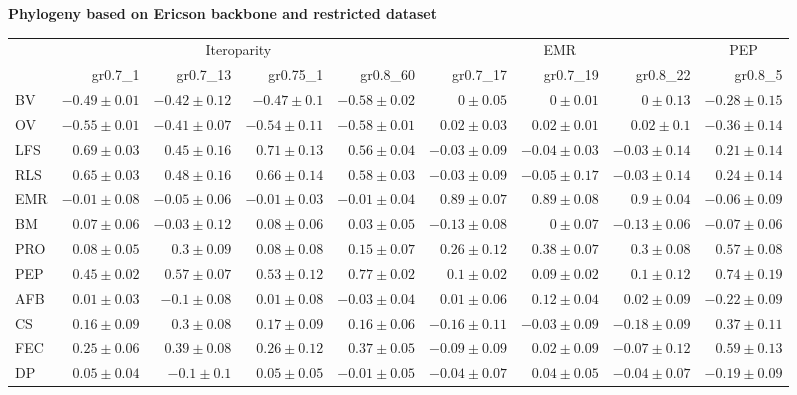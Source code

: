 \begin{landscape}
\begin{table}
\begin{footnotesize}
\textbf{Phylogeny based on Ericson backbone and restricted dataset}

\begin{tabular}{@{}l|rrrr|rrr|r@{}}
\toprule
 & \multicolumn{4}{c|}{Iteroparity} & \multicolumn{3}{c|}{EMR} & \multicolumn{1}{c}{PEP}\\
 & gr0.7\_1 & gr0.7\_13 & gr0.75\_1 & gr0.8\_60 & gr0.7\_17 & gr0.7\_19 & gr0.8\_22 & gr0.8\_5\\
\midrule
BV & $-0.49 \pm 0.01$ & $-0.42 \pm 0.12$ & $-0.47 \pm 0.1$ & $-0.58 \pm 0.02$ & $0 \pm 0.05$ & $0 \pm 0.01$ & $0 \pm 0.13$ & $-0.28 \pm 0.15$\\
OV & $-0.55 \pm 0.01$ & $-0.41 \pm 0.07$ & $-0.54 \pm 0.11$ & $-0.58 \pm 0.01$ & $0.02 \pm 0.03$ & $0.02 \pm 0.01$ & $0.02 \pm 0.1$ & $-0.36 \pm 0.14$\\
LFS & $0.69 \pm 0.03$ & $0.45 \pm 0.16$ & $0.71 \pm 0.13$ & $0.56 \pm 0.04$ & $-0.03 \pm 0.09$ & $-0.04 \pm 0.03$ & $-0.03 \pm 0.14$ & $0.21 \pm 0.14$\\
RLS & $0.65 \pm 0.03$ & $0.48 \pm 0.16$ & $0.66 \pm 0.14$ & $0.58 \pm 0.03$ & $-0.03 \pm 0.09$ & $-0.05 \pm 0.17$ & $-0.03 \pm 0.14$ & $0.24 \pm 0.14$\\
EMR & $-0.01 \pm 0.08$ & $-0.05 \pm 0.06$ & $-0.01 \pm 0.03$ & $-0.01 \pm 0.04$ & $0.89 \pm 0.07$ & $0.89 \pm 0.08$ & $0.9 \pm 0.04$ & $-0.06 \pm 0.09$\\
BM & $0.07 \pm 0.06$ & $-0.03 \pm 0.12$ & $0.08 \pm 0.06$ & $0.03 \pm 0.05$ & $-0.13 \pm 0.08$ & $0 \pm 0.07$ & $-0.13 \pm 0.06$ & $-0.07 \pm 0.06$\\
PRO & $0.08 \pm 0.05$ & $0.3 \pm 0.09$ & $0.08 \pm 0.08$ & $0.15 \pm 0.07$ & $0.26 \pm 0.12$ & $0.38 \pm 0.07$ & $0.3 \pm 0.08$ & $0.57 \pm 0.08$\\
PEP & $0.45 \pm 0.02$ & $0.57 \pm 0.07$ & $0.53 \pm 0.12$ & $0.77 \pm 0.02$ & $0.1 \pm 0.02$ & $0.09 \pm 0.02$ & $0.1 \pm 0.12$ & $0.74 \pm 0.19$\\
AFB & $0.01 \pm 0.03$ & $-0.1 \pm 0.08$ & $0.01 \pm 0.08$ & $-0.03 \pm 0.04$ & $0.01 \pm 0.06$ & $0.12 \pm 0.04$ & $0.02 \pm 0.09$ & $-0.22 \pm 0.09$\\
CS & $0.16 \pm 0.09$ & $0.3 \pm 0.08$ & $0.17 \pm 0.09$ & $0.16 \pm 0.06$ & $-0.16 \pm 0.11$ & $-0.03 \pm 0.09$ & $-0.18 \pm 0.09$ & $0.37 \pm 0.11$\\
FEC & $0.25 \pm 0.06$ & $0.39 \pm 0.08$ & $0.26 \pm 0.12$ & $0.37 \pm 0.05$ & $-0.09 \pm 0.09$ & $0.02 \pm 0.09$ & $-0.07 \pm 0.12$ & $0.59 \pm 0.13$\\
DP & $0.05 \pm 0.04$ & $-0.1 \pm 0.1$ & $0.05 \pm 0.05$ & $-0.01 \pm 0.05$ & $-0.04 \pm 0.07$ & $0.04 \pm 0.05$ & $-0.04 \pm 0.07$ & $-0.19 \pm 0.09$\\

\end{tabular}
\end{footnotesize}
\end{table}
\end{landscape}
